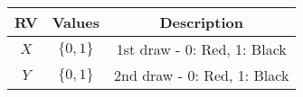 
\begin{center}
\begin{tabular}{|c|c|c|}
\hline
\textbf{RV}& \textbf{Values} & \textbf{Description} \\ \hline
$X$		   & 	$\{0,1\}$	&  1st draw - 0: Red, 1: Black\\ \hline
$Y$ 		   & 	$\{0,1\}$	&  2nd draw - 0: Red, 1: Black\\ \hline
\end{tabular}
\end{center}
